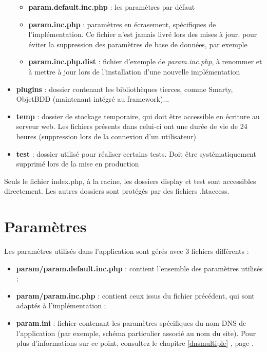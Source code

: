 \begin{itemize}
\begin{itemize}
\item \textbf{param.default.inc.php} : les paramètres par défaut
\item \textbf{param.inc.php} : paramètres en écrasement, spécifiques de l'implémentation. Ce fichier n'est jamais livré lors des mises à jour, pour éviter la suppression des paramètres de base de données, par exemple
\item \textbf{param.inc.php.dist} : fichier d'exemple de \textit{param.inc.php}, à renommer et à mettre à jour lors de l'installation d'une nouvelle implémentation
\end{itemize}
\item \textbf{plugins} : dossier contenant les bibliothèques tierces, comme Smarty, ObjetBDD (maintenant intégré au framework)...
\item \textbf{temp} : dossier de stockage temporaire, qui doit être accessible en écriture au serveur web. Les fichiers présents dans celui-ci ont une durée de vie de 24 heures (suppression lors de la connexion d'un utilisateur)
\item \textbf{test} : dossier utilisé pour réaliser certains tests. Doit être systématiquement supprimé lors de la mise en production
\end{itemize}

Seuls le fichier index.php, à la racine, les dossiers display et test sont accessibles directement. Les autres dossiers sont protégés par des fichiers .htaccess.

\section{Paramètres}

Les paramètres utilisés dans l'application sont gérés avec 3 fichiers différents :
\begin{itemize}
\item \textbf{param/param.default.inc.php} : contient l'ensemble des paramètres utilisés ;
\item \textbf{param/param.inc.php} : contient ceux issus du fichier précédent, qui sont adaptés à l'implémentation ;
\item \textbf{param.ini} : fichier contenant les paramètres spécifiques du nom DNS de l'application (par exemple, schéma particulier associé au nom du site). Pour plus d'informations sur ce point, consultez le chapitre \ref{dnsmultiple} \textit{}, page \pageref{dnsmultiple}.
\end{itemize}


